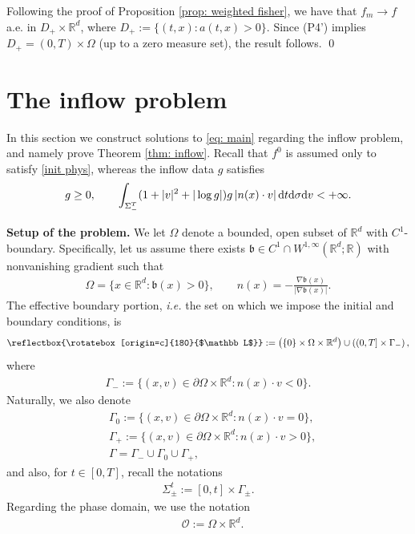 \documentclass[10pt, reqno]{amsart}
\theoremstyle{plain}
\theoremstyle{definition}
\theoremstyle{remark}
\renewenvironment{proof}[1][\proofname]{\noindent{\scshape #1.\quad}}{\qed}
\numberwithin{equation}{section}
\newcommand{\bbGamma}{\reflectbox{\rotatebox[origin=c]{180}{$\mathbb L$}}}
\newcommand{\calO}{\mathcal O}
\newcommand{\p}{\partial}
\newcommand{\R}{\mathbb{R}}
\newcommand{\dv}{\textnormal{d}v}
\newcommand{\dt}{\textnormal{d}t}
\newcommand{\tnd}{\textnormal{d}}
\newcommand{\lt}{\left}
\newcommand{\rt}{\right}
\begin{document}
\begin{proof}
    Following the proof of Proposition \ref{prop: weighted fisher}, we have that $f_m\to f$ a.e. in $D_+\times\R^d$, where $D_+ := \{(t,x):a(t,x)>0\}$. Since (P4') implies $D_+ = (0,T)\times\Omega$ (up to a zero measure set), the result follows.
\end{proof}



%
%
%
%
%
%

\section{The inflow problem} \label{sec: inflow}

In this section we construct solutions to \eqref{eq: main} regarding the inflow problem, and namely prove Theorem \ref{thm: inflow}. Recall that $f^0$ is assumed only to satisfy \eqref{init phys}, whereas the inflow data $g$ satisfies
\begin{align}\label{ASSUMP g}
    g\ge 0, \qquad \int_{\Sigma_-^T} (1+|v|^2+|\log g|) g \,|n(x)\cdot v|\,\dt\tnd\sigma\dv < +\infty.
\end{align}

\noindent
\textbf{Setup of the problem.} We let $\Omega$ denote a bounded, open subset of $\R^d$ with $C^1$-boundary. Specifically, let us assume there exists $\mathfrak{b}\in C^1\cap W^{1,\infty}(\R^d;\R)$ with nonvanishing gradient such that
\begin{align*}
    \Omega = \{x\in \R^d : \mathfrak{b}(x) > 0 \}, \qquad 
    n(x) = - \frac{\nabla \mathfrak{b}(x)}{|\nabla \mathfrak{b}(x)|}.
\end{align*}
The effective boundary portion, \textit{i.e.} the set on which we impose the initial and boundary conditions, is
\begin{align*}
    \bbGamma := \lt( \{0\}\times \Omega\times \R^d \rt)  \cup \lt( (0,T] \times \Gamma_- \rt),
\end{align*}
where
\begin{align*}
    \Gamma_- := \{(x,v)\in \p\Omega\times\R^d : n(x)\cdot v < 0\}.
\end{align*}
Naturally, we also denote
\begin{align*}
    &\Gamma_0 := \{(x,v)\in \p\Omega\times\R^d : n(x)\cdot v = 0\},\\
    &\Gamma_+ := \{(x,v)\in \p\Omega\times\R^d : n(x)\cdot v > 0\}, \\
    &\Gamma = \Gamma_- \cup \Gamma_0 \cup \Gamma_+,
\end{align*}
and also, for $t\in [0,T]$, recall the notations
\begin{align*}
    \Sigma_{\pm}^t := [0,t]\times \Gamma_{\pm}.
\end{align*}
Regarding the phase domain, we use the notation
\begin{align*}
    &\calO := \Omega\times\R^d.
\end{align*}
\end{document}
